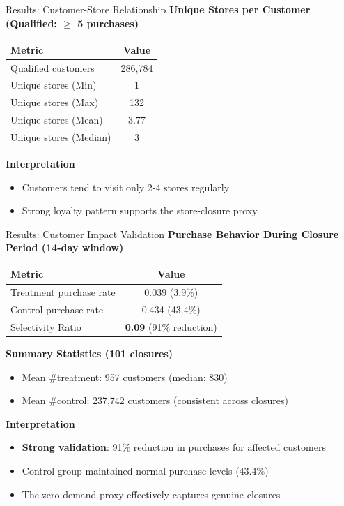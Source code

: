 \documentclass[aspectratio=169]{beamer}  %
\begin{document}
\begin{frame}{Results: Customer-Store Relationship}
\textbf{Unique Stores per Customer (Qualified: $\geq$ 5 purchases)}
\begin{table}[h]
\centering
\small
\begin{tabular}{lc}
\toprule
\textbf{Metric} & \textbf{Value} \\
\midrule
Qualified customers & 286,784 \\
Unique stores (Min) & 1 \\
Unique stores (Max) & 132 \\
Unique stores (Mean) & 3.77 \\
Unique stores (Median) & 3 \\
\bottomrule
\end{tabular}
\end{table}

\textbf{Interpretation}
\begin{itemize}
    \item Customers tend to visit only 2-4 stores regularly
    \item Strong loyalty pattern supports the store-closure proxy
\end{itemize}
\end{frame}

\begin{frame}{Results: Customer Impact Validation}
\textbf{Purchase Behavior During Closure Period (14-day window)}
\begin{table}[h]
\centering
\small
\begin{tabular}{lc}
\toprule
\textbf{Metric} & \textbf{Value} \\
\midrule
Treatment purchase rate & 0.039 (3.9\%) \\
Control purchase rate & 0.434 (43.4\%) \\
\midrule
Selectivity Ratio & \textbf{0.09} (91\% reduction) \\
\bottomrule
\end{tabular}
\end{table}

\textbf{Summary Statistics (101 closures)}
\begin{itemize}
    \item Mean \#treatment: 957 customers (median: 830)
    \item Mean \#control: 237,742 customers (consistent across closures)
\end{itemize}

\textbf{Interpretation}
\begin{itemize}
    \item \textbf{Strong validation}: 91\% reduction in purchases for affected customers
    \item Control group maintained normal purchase levels (43.4\%)
    \item The zero-demand proxy effectively captures genuine closures
\end{itemize}
\end{frame}
\end{document}
